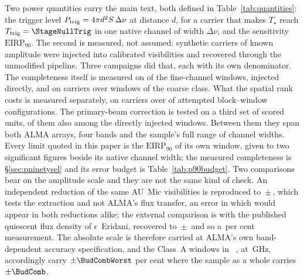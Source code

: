 Two power quantities carry the main text, both defined in
Table~\ref{tab:quantities}: the trigger level $P_{\rm trig} = 4\pi
d^{2}S\,\Delta\nu$ at distance $d$, for a carrier that makes $T_\star$ reach
$T_{\rm trig}=\StageNullTrig$ in one native channel of width $\Delta\nu$,
and the sensitivity $\mathrm{EIRP}_{90}$. The second is measured, not
assumed: synthetic carriers of known amplitude were injected into
calibrated visibilities and recovered through the unmodified pipeline.
Three campaigns did that, each with its own denominator. The completeness
itself is measured on
\MkInjCompWin{} of the \MkInjCompDenom{} fine-channel windows, injected
directly, and on \SensNToneCoarse{} carriers over \SensNInjCoarse{} windows
of the coarse class. What the spatial rank costs is measured separately, on
\SelNTone{} carriers over \MkInjSelUnit{} of \MkInjSelTotal{} attempted
block--window configurations. The primary-beam correction is tested on a
third set of \MkInjBeamUnit{} scored units, \MkInjBeamShared{} of them also
among the directly injected windows. Between them they span both ALMA
arrays, four bands and the sample's full range of
channel widths. Every limit quoted in
this paper is the $\mathrm{EIRP}_{90}$ of its own window, given to two
significant figures beside its native channel width; the measured
completeness is \S\ref{sec:pninetysel} and its error
budget is Table~\ref{tab:p90budget}. Two comparisons bear on the amplitude
scale and they are not the same kind of check. An independent reduction of
the same AU~Mic visibilities is reproduced to
\PxJanRatio\,$\pm$\,\PxJanRatioErr, which tests the extraction and not
ALMA's flux transfer, an error in which would appear in both reductions
alike; the external comparison is with the published quiescent flux
density of $\epsilon$~Eridani, recovered to
\PxEpsRatio\,$\pm$\,\PxEpsRatioErr{} \citep{Burton2022} and so a
\SbEpsPct\,per cent measurement. The absolute scale is therefore carried
at ALMA's own band-dependent accuracy specification, and the \BudNHiWin{}
Class~A windows in \BudHiBandWord~\BudHiBands, at \BudHiGHzList\,GHz,
accordingly carry $\pm\BudCombWorst$ per cent where the sample as a whole
carries $\pm\BudComb$.

